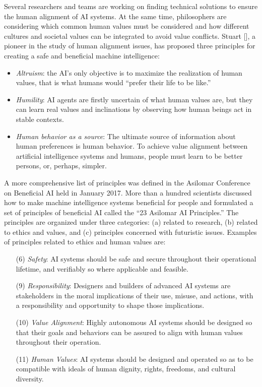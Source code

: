 Several researchers and teams are working on finding technical solutions to ensure the human alignment of AI systems. At the same time, philosophers are considering which common human values must be considered and how different cultures and societal values can be integrated to avoid value conflicts. Stuart\break \citeauthor{chap:7:Russell:2020} [\citeyear{chap:7:Russell:2020}], a pioneer in the study of human alignment issues, has proposed three principles for creating a safe and beneficial machine intelligence:

\begin{itemize}
\item \textit{Altruism}: the AI's only objective is to maximize the realization of human values, that is what humans would ``prefer their life to be like.''
\item \textit{Humility}: AI agents are firstly uncertain of what human values are, but they can learn real values and inclinations by observing how human beings act in stable contexts.
\item \textit{Human behavior as a source}: The ultimate source of information about human preferences is human behavior. To achieve value alignment between artificial intelligence systems and humans, people must learn to be better persons, or, perhaps, simpler.
\end{itemize}

A more comprehensive list of principles was defined in the Asilomar Conference on Beneficial AI held in January 2017. More than a hundred scientists discussed how to make machine intelligence systems beneficial for people and formulated a set of principles of beneficial AI called the ``23 Asilomar AI Principles.'' The principles are organized under three categories: (a) related to research, (b) related to ethics and values, and (c) principles concerned with futuristic issues. Examples of principles related to ethics and human values are:

\begin{enumerate}
\item[(6)] \textit{Safety}: AI systems should be safe and secure throughout their operational lifetime, and verifiably so where applicable and feasible.
\item[(9)] \textit{Responsibility}: Designers and builders of advanced AI systems are stakeholders in the moral implications of their use, misuse, and actions, with a responsibility and opportunity to shape those implications.
\item[(10)] \textit{Value Alignment}: Highly autonomous AI systems should be designed so that their goals and behaviors can be assured to align with human values throughout their operation.
\item[(11)] \textit{Human Values}: AI systems should be designed and operated so as to be compatible with ideals of human dignity, rights, freedoms, and cultural diversity.
\end{enumerate}

